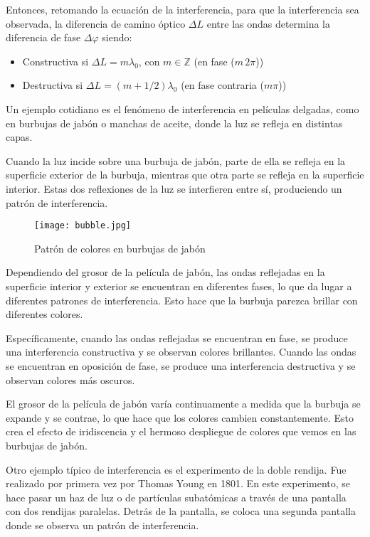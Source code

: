 Entonces, retomando la ecuación de la interferencia, para que la interferencia sea observada, la diferencia de camino óptico \(\Delta L\) entre las ondas determina la diferencia de fase \(\Delta \varphi\) siendo:
\begin{itemize}
  \item Constructiva si \(\Delta L = m \lambda_0\), con \(m \in \mathbb{Z}\) (en fase (\(m\,2\pi\)))
  \item Destructiva si \(\Delta L = (m + 1/2)\lambda_0\) (en fase contraria (\(m\pi\)))
\end{itemize}
Un ejemplo cotidiano es el fenómeno de interferencia en películas delgadas, como en burbujas de jabón o manchas de aceite, donde la luz se refleja en distintas capas.

Cuando la luz incide sobre una burbuja de jabón, parte de ella se refleja en la superficie exterior de la burbuja, mientras que otra parte se refleja en la superficie interior. Estas dos reflexiones de la luz se interfieren entre sí, produciendo un patrón de interferencia.

\begin{wrapfigure}{l}{0.24\textwidth}
  \centering
  \texttt{[image: bubble.jpg]}
  \caption{Patrón de colores en burbujas de jabón}
  \label{fig:burbujas_jabon}
\end{wrapfigure}
Dependiendo del grosor de la película de jabón, las ondas reflejadas en la superficie interior y exterior se encuentran en diferentes fases, lo que da lugar a diferentes patrones de interferencia. Esto hace que la burbuja parezca brillar con diferentes colores.

Específicamente, cuando las ondas reflejadas se encuentran en fase, se produce una interferencia constructiva y se observan colores brillantes. Cuando las ondas se encuentran en oposición de fase, se produce una interferencia destructiva y se observan colores más oscuros.

El grosor de la película de jabón varía continuamente a medida que la burbuja se expande y se contrae, lo que hace que los colores cambien constantemente. Esto crea el efecto de iridiscencia y el hermoso despliegue de colores que vemos en las burbujas de jabón.

Otro ejemplo típico de interferencia es el experimento de la doble rendija. Fue realizado por primera vez por Thomas Young en 1801. En este experimento, se hace pasar un haz de luz o de partículas subatómicas a través de una pantalla con dos rendijas paralelas. Detrás de la pantalla, se coloca una segunda pantalla donde se observa un patrón de interferencia.

